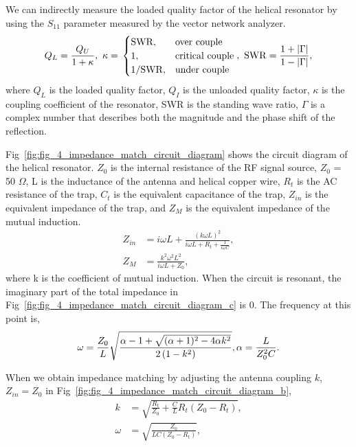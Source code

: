 We can indirectly measure the loaded quality factor of the helical resonator by using the ${S}_{11}$ parameter measured by the vector network analyzer.
\begin{equation}
    Q_L = \frac{Q_U}{1 + \kappa},\ \kappa =\\
    \begin{cases}
        \mathrm{SWR},     & \text{over couple}     \\
        1,                & \text{critical couple} \\
        1 / \mathrm{SWR}, & \text{under couple}    \\
    \end{cases}
    ,\ \mathrm{SWR} = \frac{1 + |\Gamma|}{1 - |\Gamma|},
\end{equation}
where $Q_L$ is the loaded quality factor, $Q_I$ is the unloaded quality factor, $\kappa$ is the coupling coefficient of the resonator, SWR is the standing wave ratio, $\Gamma$ is a complex number that describes both the magnitude and the phase shift of the reflection.

Fig~\ref{fig:fig_4_impedance_match_circuit_diagram} shows the circuit diagram of the helical resonator. $Z_0$ is the internal resistance of the RF signal source, $Z_0$ = 50 $\Omega$, L is the inductance of the antenna and helical copper wire, $R_t$ is the AC resistance of the trap, $C_t$ is the equivalent capacitance of the trap, $Z_{in}$ is the equivalent impedance of the trap, and $Z_M$ is the equivalent impedance of the mutual induction.
\begin{equation}
    \begin{aligned}
        Z_{in} & =i \omega L+\frac{(k \omega L)^2}{i \omega L+R_t+\frac{1}{i \omega C}}, \\
        Z_M    & =\frac{k^2 \omega^2 L^2}{i \omega L+Z_0},
    \end{aligned}
\end{equation}
where k is the coefficient of mutual induction. When the circuit is resonant, the imaginary part of the total impedance in Fig~\ref{fig:fig_4_impedance_match_circuit_diagram_c} is 0. The frequency at this point is,
\begin{equation}
    \omega=\frac{Z_0}{L} \sqrt{\frac{\alpha-1+\sqrt{(\alpha+1)^2-4 \alpha k^2}}{2\left(1-k^2\right)}},\ \\
    \alpha=\frac{L}{Z_0^2 C}.
\end{equation}

When we obtain impedance matching by adjusting the antenna coupling $k$, $Z_{in} = Z_0$ in Fig~\ref{fig:fig_4_impedance_match_circuit_diagram_b},
\begin{equation}
    \begin{aligned}
        k      & =\sqrt{\frac{R_t}{Z_0}+\frac{C}{L} R_t\left(Z_0-R_t\right)}, \\
        \omega & =\sqrt{\frac{Z_0}{L C(Z_0-R_t)}},
    \end{aligned}
\end{equation}


